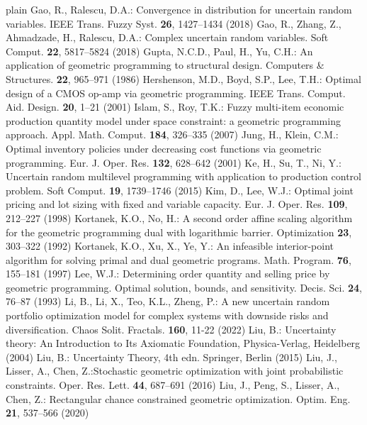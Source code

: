 \begin{thebibliography}{plain}
 Gao, R., Ralescu, D.A.: Convergence in distribution for uncertain random variables. IEEE Trans. Fuzzy Syst. {\bf 26}, 1427--1434 (2018)
 Gao, R., Zhang, Z., Ahmadzade, H., Ralescu, D.A.: Complex uncertain random variables. Soft Comput. {\bf 22}, 5817--5824 (2018)
 Gupta, N.C.D., Paul, H., Yu, C.H.: An application of geometric programming to structural design. Computers \& Structures. {\bf 22}, 965--971 (1986)
 Hershenson, M.D., Boyd, S.P., Lee, T.H.: Optimal design of a CMOS op-amp via geometric programming. IEEE Trans. Comput. Aid. Design. {\bf 20}, 1--21 (2001) 
 Islam, S., Roy, T.K.: Fuzzy multi-item economic production quantity model under space constraint: a geometric programming approach. Appl. Math. Comput. {\bf 184}, 326--335 (2007)
 Jung, H., Klein, C.M.: Optimal inventory policies under decreasing cost functions via geometric programming. Eur. J. Oper. Res. {\bf 132}, 628--642 (2001) 
 Ke, H., Su, T., Ni, Y.: Uncertain random multilevel programming with application to production control problem. Soft Comput. {\bf 19}, 1739--1746 (2015)
 Kim, D., Lee, W.J.: Optimal joint pricing and lot sizing with fixed and variable capacity. Eur. J. Oper. Res. {\bf 109}, 212--227 (1998)
 Kortanek, K.O., No, H.: A second order affine scaling algorithm for the geometric programming dual with logarithmic barrier. Optimization {\bf23}, 303--322
(1992)
 Kortanek, K.O., Xu, X., Ye, Y.: An infeasible interior-point algorithm for solving primal and dual geometric programs. Math. Program. {\bf 76}, 155--181 (1997) 
 Lee, W.J.: Determining order quantity and selling price by geometric programming. Optimal solution, bounds, and sensitivity. Decis. Sci. {\bf 24}, 76--87 (1993)
 Li, B., Li, X., Teo, K.L., Zheng, P.: A new uncertain random portfolio optimization model for complex systems with downside risks and diversification. Chaos Solit. Fractals. {\bf 160}, 11-22 (2022)
 Liu, B.: Uncertainty theory: An Introduction to Its Axiomatic Foundation, Physica-Verlag, Heidelberg (2004)
 Liu, B.: Uncertainty Theory, 4th edn. Springer, Berlin (2015)
 Liu, J., Lisser, A., Chen, Z.:Stochastic geometric optimization with joint probabilistic constraints. Oper. Res. Lett. {\bf 44}, 687--691 (2016)
 Liu, J., Peng, S., Lisser, A., Chen, Z.: Rectangular chance constrained geometric optimization. Optim. Eng. {\bf 21}, 537--566 (2020)

\end{thebibliography}
